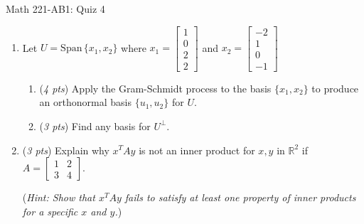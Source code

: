 \documentclass[11pt]{article}
\newcommand{\Span}{\textrm{Span}\,}
\begin{document}
\begin{center}
\Large
\rm{Math 221-AB1:  Quiz 4}
\\
\end{center}
\vspace{0.1in}
\begin{enumerate}

\item{Let $U= \Span\{x_1, x_2\}$ where $x_1 =\left[ \begin{array}{r} 1 \\ 0 \\ 2 \\ 2 \end{array} \right]$ and 
$x_2 =\left[ \begin{array}{r} -2 \\ 1 \\ 0 \\ -1 \end{array} \right]$


\begin{enumerate}
\item{(\emph{4 pts}) Apply the Gram-Schmidt process to the basis $\{x_1,x_2\}$ to produce an orthonormal basis $\{u_1,u_2\}$ for $U$.}
\item{(\emph{3 pts}) Find any basis for $U^{\perp}$.}
\end{enumerate}

}

\vspace{4.5in}


\item{(\emph{3 pts}) Explain why $x^TAy$ is not an inner product for $x,y$ in $\mathbb{R}^2$ if 
	$A = \left[ \begin{array}{rr} 1 & 2\\ 3 & 4 \end{array}\right]$.

\vspace{0.1in}

(\textit{Hint:  Show that $x^TAy$ fails to satisfy at least one property of inner products for a specific $x$ and $y$.})
}




\end{enumerate}
\end{document}
